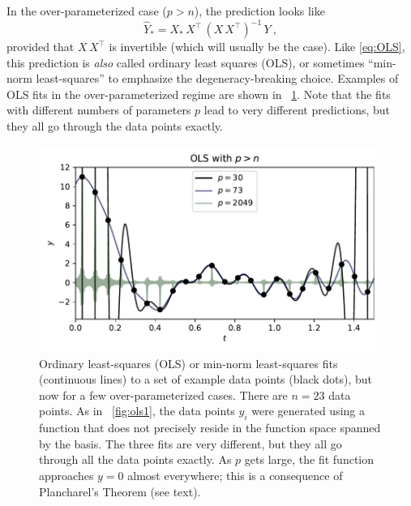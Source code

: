 \documentclass[12pt,letterpaper]{article}
\newlength{\figurewidth}
\begin{document}
In the over-parameterized case ($p>n$), the prediction looks like
\begin{equation}\label{eq:OLS2}
    \hat{Y}_\ast = X_\ast\,X^\top\,(X\,X^\top)^{-1}\,Y
    ~,
\end{equation}
provided that $X\,X^\top$ is invertible (which will usually be the case).
Like \eqref{eq:OLS}, this prediction is \emph{also} called ordinary least squares (OLS), or sometimes ``min-norm least-squares'' to emphasize the degeneracy-breaking choice.
Examples of OLS fits in the over-parameterized regime are shown in \figurename~\ref{fig:ols2}.
Note that the fits with different numbers of parameters $p$ lead to very different predictions, but they all go through the data points exactly.
\begin{figure}[t]
    \begin{mdframed}
    \includegraphics[width=\figurewidth]{paper/OLS-over.pdf}
    \caption{Ordinary least-squares (OLS) or min-norm least-squares fits (continuous lines) to a set of example data points (black dots), but now for a few over-parameterized cases. There are $n=23$ data points. As in \figurename~\ref{fig:ols1}, the data points $y_i$ were generated using a function that does not precisely reside in the function space spanned by the basis. The three fits are very different, but they all go through all the data points exactly. As $p$ gets large, the fit function approaches $y=0$ almost everywhere; this is a consequence of Plancharel's Theorem (see text).}
    \label{fig:ols2}
    \end{mdframed}
\end{figure}
\end{document}
